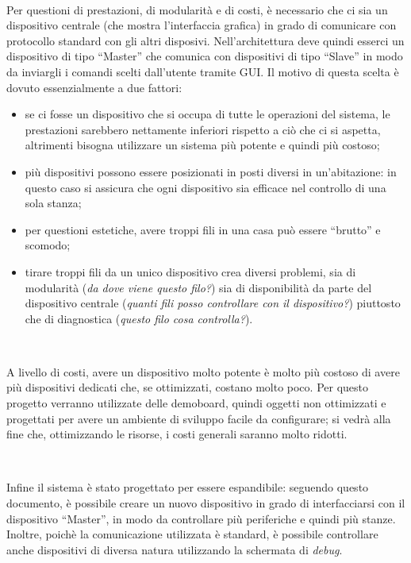 \documentclass[a4paper,titlepage]{book}
\newcommand{\itema}{\begin{itemize}[noitemsep,topsep=10pt,parsep=23pt,partopsep=0pt]}
\begin{document}
~

Per questioni di prestazioni, di modularità e di costi, è necessario che ci sia un dispositivo centrale (che mostra l'interfaccia grafica) in grado di comunicare con protocollo standard con gli altri disposivi. Nell'architettura deve quindi esserci un dispositivo di tipo ``Master'' che comunica con dispositivi di tipo ``Slave'' in modo da inviargli i comandi scelti dall'utente tramite GUI. Il motivo di questa scelta è dovuto essenzialmente a due fattori:

\itema

\item se ci fosse un dispositivo che si occupa di tutte le operazioni del sistema, le prestazioni sarebbero nettamente inferiori rispetto a ciò che ci si aspetta, altrimenti bisogna utilizzare un sistema più potente e quindi più costoso;

\item più dispositivi possono essere posizionati in posti diversi in un'abitazione: in questo caso si assicura che ogni dispositivo sia efficace nel controllo di una sola stanza;

\item per questioni estetiche, avere troppi fili in una casa può essere ``brutto'' e scomodo;

\item tirare troppi fili da un unico dispositivo crea diversi problemi, sia di modularità (\textit{da dove viene questo filo?}) sia di disponibilità da parte del dispositivo centrale (\textit{quanti fili posso controllare con il dispositivo?}) piuttosto che di diagnostica (\textit{questo filo cosa controlla?}).


\end{itemize}

~

A livello di costi, avere un dispositivo molto potente è molto più costoso di avere più dispositivi dedicati che, se ottimizzati, costano molto poco.
Per questo progetto verranno utilizzate delle demoboard, quindi oggetti non ottimizzati e progettati per avere un ambiente di sviluppo facile da configurare; si vedrà alla fine che, ottimizzando le risorse, i costi generali saranno molto ridotti.

~

Infine il sistema è stato progettato per essere espandibile: seguendo questo documento, è possibile creare un nuovo dispositivo in grado di interfacciarsi con il dispositivo ``Master'', in modo da controllare più periferiche e quindi più stanze. Inoltre, poichè la comunicazione utilizzata è standard, è possibile controllare anche dispositivi di diversa natura utilizzando la schermata di \textit{debug}.
\end{document}
